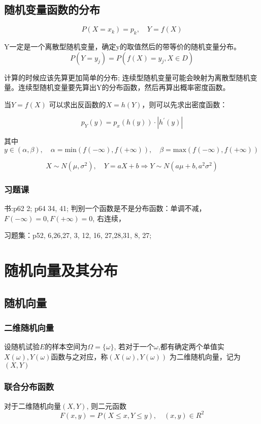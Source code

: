 \documentclass[10pt, a4paper]{article}
\begin{document}
    \subsection{随机变量函数的分布}
    $$P(X = x_k) = p_k, \quad Y = f(X)$$
   
    Y一定是一个离散型随机变量，确定y的取值然后的带等价的随机变量分布。
        $$P(Y = y_j) = P(f(X) = y_j, X \in D)$$
    
    计算的时候应该先算更加简单的分布; 连续型随机变量可能会映射为离散型随机变量。连续型随机变量要先算出Y的分布函数，然后再算出概率密度函数。

    当$Y = f(X)$ 可以求出反函数的$X = h(Y)$，则可以先求出密度函数：

    $$p_Y(y) = p_x(h(y)) \cdot |h^{'}(y)|$$
    
    其中$y \in (\alpha, \beta), \quad \alpha = \text{min}(f(-\infty), f(+\infty)), \quad \beta = \text{max}(f(-\infty), f(+\infty))$

    $$X \sim N(\mu, \sigma^2), \quad Y = aX + b \Rightarrow Y \sim N(a\mu + b, a^2\sigma^2)$$

    \subsubsection{习题课}
        书:p62 2; p64 34, 41;
        判别一个函数是不是分布函数：单调不减，$F(-\infty) = 0, F(+\infty) = 0$, 右连续，

        习题集：p52, 6,26,27, 3, 12, 16, 27,28,31, 8, 27;
\newpage

\section{随机向量及其分布}
    \subsection{随机向量}
        \subsubsection{二维随机向量}
            设随机试验$E$的样本空间为$\Omega = \{\omega\}$, 若对于一个$\omega$,都有确定两个单值实$X(\omega), Y(\omega)$函数与之对应，称$(X(\omega), Y(\omega))$ 为二维随机向量，记为 $(X, Y)$

        \subsubsection{联合分布函数}
            对于二维随机向量$(X, Y)$, 则二元函数
            $$F(x, y) = P(X \leqslant x, Y \leqslant y), \quad (x, y) \in R^2$$
        
\end{document}
